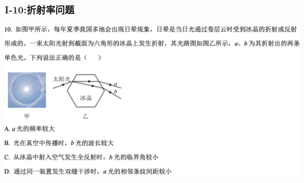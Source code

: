 \documentclass{article}
\begin{document}
\vspace{2em}

\subsubsection{I-10:折射率问题}
\includegraphics[width=50em,keepaspectratio]{./pictures/1.4-4.png}
\end{document}
